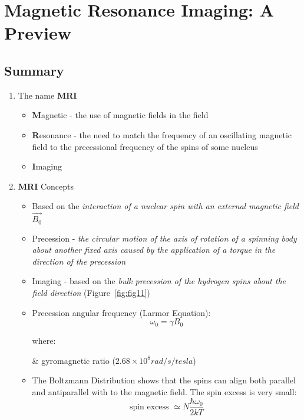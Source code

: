 \section{Magnetic Resonance Imaging: A Preview}

\subsection{Summary}
\begin{enumerate}
    \item The name \textbf{MRI}
    \begin{itemize}
        \item \textbf{M}agnetic - the use of magnetic fields in the field
        \item \textbf{R}esonance - the need to match the frequency of an oscillating magnetic field to the precessional frequency of the spins of some nucleus
        \item \textbf{I}maging
    \end{itemize}

    \item \textbf{MRI} Concepts
    \begin{itemize}
        \item Based on the \textit{interaction of a nuclear spin with an external magnetic field $\vec{B_0}$}
        \item Precession - \textit{the circular motion of the axis of rotation of a spinning body about another fixed axis caused by the application of a torque in the direction of the precession}
        \item Imaging - based on the \textit{bulk precession of the hydrogen spins about the field direction} (Figure~\ref{fig:fig11})
        \item Precession angular frequency (Larmor Equation): \\
            \begin{equation} 
                \omega_0 = \gamma B_0
            \end{equation}

            where:
            \begin{conditions}
                \gamma & gyromagnetic ratio ($2.68 \times 10^8 rad/s/tesla$)
            \end{conditions}

        \item The Boltzmann Distribution shows that the spins can align both parallel and antiparallel with to the magnetic field. The spin excess is very small: \\
            \begin{equation} 
                \text{spin excess } \simeq N \frac{\hbar \omega_0}{2kT}
            \end{equation}


\end{itemize}
\end{enumerate}
